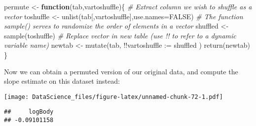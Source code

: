 \documentclass[
]{book}
\newenvironment{Shaded}{\begin{snugshade}}{\end{snugshade}}
\newcommand{\AttributeTok}[1]{\textcolor[rgb]{0.77,0.63,0.00}{#1}}
\newcommand{\CommentTok}[1]{\textcolor[rgb]{0.56,0.35,0.01}{\textit{#1}}}
\newcommand{\ConstantTok}[1]{\textcolor[rgb]{0.00,0.00,0.00}{#1}}
\newcommand{\ControlFlowTok}[1]{\textcolor[rgb]{0.13,0.29,0.53}{\textbf{#1}}}
\newcommand{\DecValTok}[1]{\textcolor[rgb]{0.00,0.00,0.81}{#1}}
\newcommand{\FunctionTok}[1]{\textcolor[rgb]{0.00,0.00,0.00}{#1}}
\newcommand{\NormalTok}[1]{#1}
\newcommand{\OtherTok}[1]{\textcolor[rgb]{0.56,0.35,0.01}{#1}}
\newcommand{\SpecialCharTok}[1]{\textcolor[rgb]{0.00,0.00,0.00}{#1}}
\newcommand{\StringTok}[1]{\textcolor[rgb]{0.31,0.60,0.02}{#1}}
\begin{document}
\begin{Shaded}
\begin{Highlighting}[]
\NormalTok{permute }\OtherTok{\textless{}{-}} \ControlFlowTok{function}\NormalTok{(tab,vartoshuffle)\{}
  \CommentTok{\# Extract column we wish to shuffle as a vector}
\NormalTok{  toshuffle }\OtherTok{\textless{}{-}} \FunctionTok{unlist}\NormalTok{(tab[,vartoshuffle],}\AttributeTok{use.names=}\ConstantTok{FALSE}\NormalTok{)}
  \CommentTok{\# The function sample() serves to randomize the order of elements in a vector}
\NormalTok{  shuffled }\OtherTok{\textless{}{-}} \FunctionTok{sample}\NormalTok{(toshuffle)}
  \CommentTok{\# Replace vector in new table (use !! to refer to a dynamic variable name)}
\NormalTok{  newtab }\OtherTok{\textless{}{-}} \FunctionTok{mutate}\NormalTok{(tab, }\SpecialCharTok{!!}\AttributeTok{vartoshuffle :=}\NormalTok{ shuffled )}
  \FunctionTok{return}\NormalTok{(newtab)}
\NormalTok{\}}
\end{Highlighting}
\end{Shaded}

Now we can obtain a permuted version of our original data, and compute the slope estimate on this dataset instead:

\begin{Shaded}
\end{Shaded}

\texttt{[image: DataScience\_files/figure-latex/unnamed-chunk-72-1.pdf]}

\begin{Shaded}
\end{Shaded}

\begin{verbatim}
##     logBody 
## -0.09101158
\end{verbatim}
\end{document}
